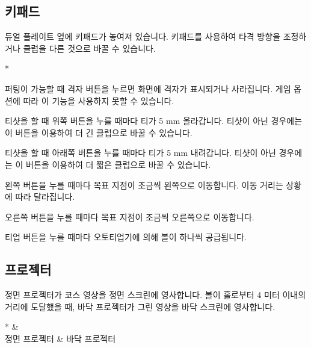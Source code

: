 \documentclass[10pt, openright, language=korean]{hzguide}
\begin{document}
\subsection{키패드}

듀얼 플레이트 옆에 키패드가 놓여져 있습니다.
키패드를 사용하여 타격 방향을 조정하거나 클럽을 다른 것으로 바꿀 수 있습니다.


\begin{callout}*
\item 퍼팅이 가능할 때 격자 버튼을 누르면 화면에 격자가 표시되거나 사라집니다. 게임 옵션에 따라 이 기능을 사용하지 못할 수 있습니다.
\item 티샷을 할 때 위쪽 버튼을 누를 때마다 티가 5 mm 올라갑니다. 티샷이 아닌 경우에는 이 버튼을 이용하여 더 긴 클럽으로 바꿀 수 있습니다.
\item 티샷을 할 때 아래쪽 버튼을 누를 때마다 티가 5 mm 내려갑니다. 티샷이 아닌 경우에는 이 버튼을 이용하여 더 짧은 클럽으로 바꿀 수 있습니다.
\item 왼쪽 버튼을 누를 때마다 목표 지점이 조금씩 왼쪽으로 이동합니다. 이동 거리는 상황에 따라 달라집니다.
\item 오른쪽 버튼을 누를 때마다 목표 지점이 조금씩 오른쪽으로 이동합니다.
\item 티업 버튼을 누를 때마다 오토티업기에 의해 볼이 하나씩 공급됩니다.
\end{callout}

\subsection{프로젝터}

정면 프로젝터가 코스 영상을 정면 스크린에 영사합니다.
볼이 홀로부터 4 미터 이내의 거리에 도달했을 때, 바닥 프로젝터가 그린 영상을 바닥 스크린에 영사합니다.

\begin{ImageTable}*
 &   \\
정면 프로젝터 & 바닥 프로젝터 \\
\end{ImageTable}

\end{document}
